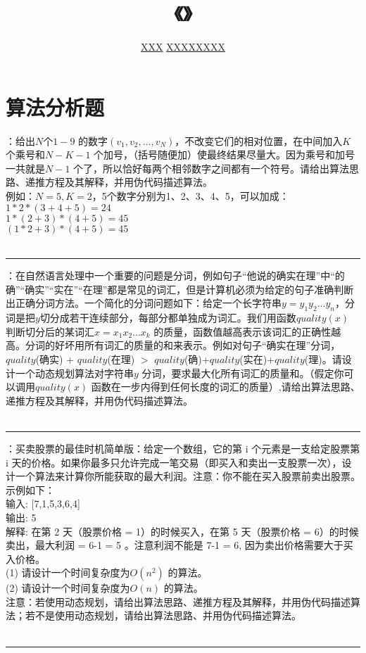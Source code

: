 \documentclass[UTF8,16pt]{article} %
\title{《\heiti{算法设计与分析}》\heiti{第{\color{red}3}次作业}}
\author{\kaishu{姓名：}\underline{XXX} \quad\quad\quad\quad\quad  \kaishu{学号：}\underline{XXXXXXXX}}
\date{}
\begin{document}
	
\maketitle
\vbox{} %

\section*{\textbf{算法分析题}}
：给出$N$个$1-9$ 的数字$(v_{1},v_{2},...,v_{N})$，不改变它们的相对位置，在中间加入$K$ 个乘号和$N-K-1$ 个加号，（括号随便加）使最终结果尽量大。因为乘号和加号一共就是$N-1$ 个了，所以恰好每两个相邻数字之间都有一个符号。请给出算法思路、递推方程及其解释，并用伪代码描述算法。\\
例如：$N=5, K=2$，5个数字分别为1、2、3、4、5，可以加成：\\
$1*2*(3+4+5)=24$ \\
$1*(2+3)*(4+5)=45$ \\
$(1*2+3)*(4+5)=45$ \\
{}\\
\rule[0pt]{14.3cm}{0.05em}

\vbox{} %
：在自然语言处理中一个重要的问题是分词，例如句子“他说的确实在理”中“的确”“确实”“实在”“在理”都是常见的词汇，但是计算机必须为给定的句子准确判断出正确分词方法。一个简化的分词问题如下：给定一个长字符串$y=y_{1}y_{2}...y_{n}$，分词是把$y$切分成若干连续部分，每部分都单独成为词汇。我们用函数$quality(x)$ 判断切分后的某词汇$x=x_{1}x_{2}...x_{k}$ 的质量，函数值越高表示该词汇的正确性越高。分词的好坏用所有词汇的质量的和来表示。例如对句子“确实在理”分词，$quality$(确实) + $quality$(在理) $>$ $quality$(确)+$quality$(实在)+$quality$(理)。请设计一个动态规划算法对字符串$y$ 分词，要求最大化所有词汇的质量和。（假定你可以调用$quality(x)$ 函数在一步内得到任何长度的词汇的质量）,请给出算法思路、递推方程及其解释，并用伪代码描述算法。 \\
{}\\
\rule[0pt]{14.3cm}{0.05em}

\vbox{} %
：买卖股票的最佳时机简单版：给定一个数组，它的第 i 个元素是一支给定股票第 i 天的价格。如果你最多只允许完成一笔交易（即买入和卖出一支股票一次），设计一个算法来计算你所能获取的最大利润。注意：你不能在买入股票前卖出股票。示例如下：\\
输入: [7,1,5,3,6,4] \\
输出: 5 \\
解释: 在第 2 天（股票价格 = 1）的时候买入，在第 5 天（股票价格 = 6）的时候卖出，最大利润 = 6-1 = 5 。注意利润不能是 7-1 = 6, 因为卖出价格需要大于买入价格。\\
(1) 请设计一个时间复杂度为$O(n^2)$ 的算法。\\
(2) 请设计一个时间复杂度为$O(n)$ 的算法。\\
注意：若使用动态规划，请给出算法思路、递推方程及其解释，并用伪代码描述算法；若不是使用动态规划，请给出算法思路、并用伪代码描述算法。\\
\noindent
{}\\
\rule[0pt]{14.3cm}{0.05em}
\end{document}
